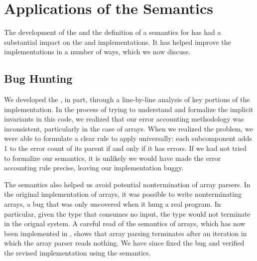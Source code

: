 \section{Applications of the Semantics}
\label{sec:applications}

The development of the \ddc{} and the definition of a semantics for \ipads{}
has had a substantial impact on the \padsc{} and \padsml{}
implementations. It has helped improve the implementations in a number
of ways, which we now discuss.

\subsection{Bug Hunting}

We developed the \ddc{}, in part, through a line-by-line analysis of key
portions of the \padsc{} implementation.  In the process of trying to understand and formalize the
implicit invariants in this code,
we realized that our error accounting methodology was
inconsistent, particularly in the case of arrays.  When we realized
the problem, we were able to formulate a clear rule to apply
universally: each subcomponent adds 1 to the error count of its parent
if and only if it has errors.  If we had not tried to formalize our
semantics, it is unlikely we would have made the error accounting rule
precise, leaving our implementation buggy.

The semantics also helped us avoid potential nontermination of array
parsers. In the original implementation of \padsc{} arrays, it was
possible to write nonterminating arrays, a bug that was only
uncovered when it hung a real program. In particular, given the
type  that consumes no input, the 
type  would not terminate in the
orignal system.  A careful read of the 
  \ddc{} semantics of arrays, which has now been implemented in
  \padsc{}, shows that array parsing terminates after an iteration in
  which the array parser reads nothing.
We have since fixed the bug and verified the revised implementation using the semantics.



